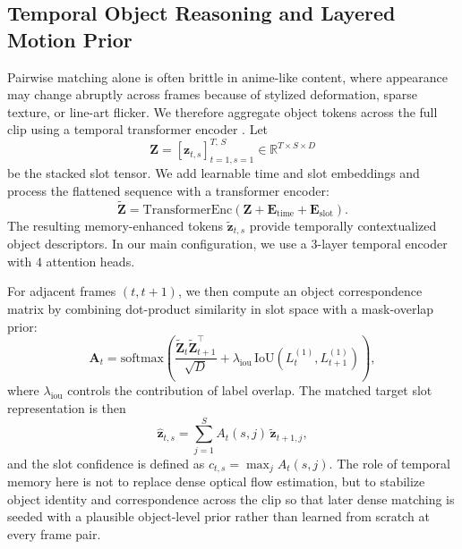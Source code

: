\subsection{Temporal Object Reasoning and Layered Motion Prior}

Pairwise matching alone is often brittle in anime-like content, where appearance may change abruptly across frames because of stylized deformation, sparse texture, or line-art flicker. We therefore aggregate object tokens across the full clip using a temporal transformer encoder \cite{vaswani2017attention}. Let
\begin{equation}
\mathbf{Z} = [\mathbf{z}_{t,s}]_{t=1,s=1}^{T,\,S} \in \mathbb{R}^{T\times S\times D}
\end{equation}
be the stacked slot tensor. We add learnable time and slot embeddings and process the flattened sequence with a transformer encoder:
\begin{equation}
\widetilde{\mathbf{Z}} = \mathrm{TransformerEnc}(\mathbf{Z} + \mathbf{E}_{\mathrm{time}} + \mathbf{E}_{\mathrm{slot}}).
\end{equation}
The resulting memory-enhanced tokens $\tilde{\mathbf{z}}_{t,s}$ provide temporally contextualized object descriptors. In our main configuration, we use a $3$-layer temporal encoder with $4$ attention heads.

For adjacent frames $(t,t+1)$, we then compute an object correspondence matrix by combining dot-product similarity in slot space with a mask-overlap prior:
\begin{equation}
\label{eq:slot_matching}
\mathbf{A}_t = \mathrm{softmax}\left(\frac{\widetilde{\mathbf{Z}}_t\widetilde{\mathbf{Z}}_{t+1}^{\top}}{\sqrt{D}} + \lambda_{\mathrm{iou}}\,\mathrm{IoU}(L_t^{(1)},L_{t+1}^{(1)})\right),
\end{equation}
where $\lambda_{\mathrm{iou}}$ controls the contribution of label overlap. The matched target slot representation is then
\begin{equation}
\hat{\mathbf{z}}_{t,s} = \sum_{j=1}^{S} A_t(s,j)\,\tilde{\mathbf{z}}_{t+1,j},
\end{equation}
and the slot confidence is defined as $c_{t,s}=\max_j A_t(s,j)$. The role of temporal memory here is not to replace dense optical flow estimation, but to stabilize object identity and correspondence across the clip so that later dense matching is seeded with a plausible object-level prior rather than learned from scratch at every frame pair.

